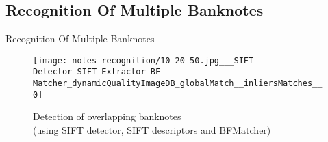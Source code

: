 \subsection*{Recognition Of Multiple Banknotes}
\begin{frame}{Recognition Of Multiple Banknotes}
	\begin{figure}[H]
		\centering
		\texttt{[image: notes-recognition/10-20-50.jpg\_\_\_SIFT-Detector\_SIFT-Extractor\_BF-Matcher\_dynamicQualityImageDB\_globalMatch\_\_inliersMatches\_\_0]}
		\caption{Detection of overlapping banknotes\\(using SIFT detector, SIFT descriptors and BFMatcher)}
		\label{fig:recognition-overlapping-banknotes-3}
	\end{figure}
\end{frame}


